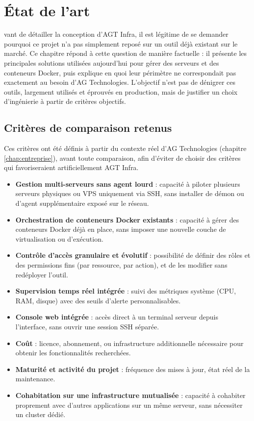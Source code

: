 \chapter{État de l'art}
\label{chap:etat-art}



vant de détailler la conception d'AGT Infra, il est légitime de se demander
pourquoi ce projet n'a pas simplement reposé sur un outil déjà existant sur
le marché. Ce chapitre répond à cette question de manière factuelle : il
présente les principales solutions utilisées aujourd'hui pour gérer des
serveurs et des conteneurs Docker, puis explique en quoi leur périmètre ne
correspondait pas exactement au besoin d'AG Technologies. L'objectif n'est
pas de dénigrer ces outils, largement utilisés et éprouvés en production,
mais de justifier un choix d'ingénierie à partir de critères objectifs.
\minisommaire
\section{Critères de comparaison retenus}

Ces critères ont été définis à partir du contexte réel d'AG Technologies
(chapitre \ref{chap:entreprise}), avant toute comparaison, afin d'éviter de
choisir des critères qui favoriseraient artificiellement AGT Infra.

\begin{itemize}
  \item \textbf{Gestion multi-serveurs sans agent lourd} : capacité à piloter
  plusieurs serveurs physiques ou VPS uniquement via SSH, sans installer de
  démon ou d'agent supplémentaire exposé sur le réseau.
  \item \textbf{Orchestration de conteneurs Docker existants} : capacité à
  gérer des conteneurs Docker déjà en place, sans imposer une nouvelle couche
  de virtualisation ou d'exécution.
  \item \textbf{Contrôle d'accès granulaire et évolutif} : possibilité de
  définir des rôles et des permissions fins (par ressource, par action), et
  de les modifier sans redéployer l'outil.
  \item \textbf{Supervision temps réel intégrée} : suivi des métriques
  système (CPU, RAM, disque) avec des seuils d'alerte personnalisables.
  \item \textbf{Console web intégrée} : accès direct à un terminal serveur
  depuis l'interface, sans ouvrir une session SSH séparée.
  \item \textbf{Coût} : licence, abonnement, ou infrastructure additionnelle
  nécessaire pour obtenir les fonctionnalités recherchées.
  \item \textbf{Maturité et activité du projet} : fréquence des mises à jour,
  état réel de la maintenance.
  \item \textbf{Cohabitation sur une infrastructure mutualisée} : capacité à
  cohabiter proprement avec d'autres applications sur un même serveur, sans
  nécessiter un cluster dédié.
\end{itemize}

